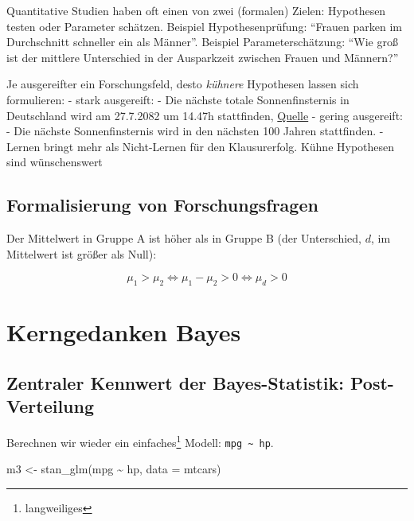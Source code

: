 \documentclass[
  a4paper,
  DIV=11]{scrreprt}
\newenvironment{Shaded}{\begin{snugshade}}{\end{snugshade}}
\newcommand{\AttributeTok}[1]{\textcolor[rgb]{0.40,0.45,0.13}{#1}}
\newcommand{\FunctionTok}[1]{\textcolor[rgb]{0.28,0.35,0.67}{#1}}
\newcommand{\NormalTok}[1]{\textcolor[rgb]{0.00,0.23,0.31}{#1}}
\newcommand{\OtherTok}[1]{\textcolor[rgb]{0.00,0.23,0.31}{#1}}
\newcommand{\SpecialCharTok}[1]{\textcolor[rgb]{0.37,0.37,0.37}{#1}}
\theoremstyle{definition}
\theoremstyle{remark}
\begin{document}
Quantitative Studien haben oft einen von zwei (formalen) Zielen:
Hypothesen testen oder Parameter schätzen. Beispiel Hypothesenprüfung:
``Frauen parken im Durchschnitt schneller ein als Männer''. Beispiel
Parameterschätzung: ``Wie groß ist der mittlere Unterschied in der
Ausparkzeit zwischen Frauen und Männern?''

Je ausgereifter ein Forschungsfeld, desto \emph{kühnere} Hypothesen
lassen sich formulieren: - stark ausgereift: - Die nächste totale
Sonnenfinsternis in Deutschland wird am 27.7.2082 um 14.47h stattfinden,
\href{https://www.solar-eclipse.info/de/eclipse/country/DE/}{Quelle} -
gering ausgereift: - Die nächste Sonnenfinsternis wird in den nächsten
100 Jahren stattfinden. - Lernen bringt mehr als Nicht-Lernen für den
Klausurerfolg. Kühne Hypothesen sind wünschenswert 🦹

\hypertarget{formalisierung-von-forschungsfragen}{%
\subsection{Formalisierung von
Forschungsfragen}\label{formalisierung-von-forschungsfragen}}

Der Mittelwert in Gruppe A ist höher als in Gruppe B (der Unterschied,
\(d\), im Mittelwert ist größer als Null):

\[\mu_1 > \mu_2 \Leftrightarrow \mu_1 - \mu_2 > 0 \Leftrightarrow \mu_d > 0\]

\hypertarget{kerngedanken-bayes}{%
\section{Kerngedanken Bayes}\label{kerngedanken-bayes}}

\hypertarget{zentraler-kennwert-der-bayes-statistik-post-verteilung}{%
\subsection{Zentraler Kennwert der Bayes-Statistik:
Post-Verteilung}\label{zentraler-kennwert-der-bayes-statistik-post-verteilung}}

Berechnen wir wieder ein einfaches\footnote{langweiliges} Modell:
\texttt{mpg\ \textasciitilde{}\ hp}.

\begin{Shaded}
\begin{Highlighting}[]
\NormalTok{m3 }\OtherTok{\textless{}{-}} \FunctionTok{stan\_glm}\NormalTok{(mpg }\SpecialCharTok{\textasciitilde{}}\NormalTok{ hp, }\AttributeTok{data =}\NormalTok{ mtcars)}
\end{Highlighting}
\end{Shaded}
\end{document}
